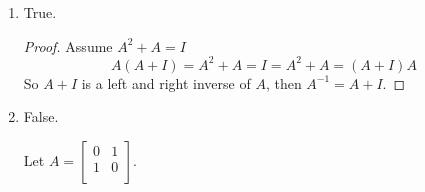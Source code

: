 \documentclass[12pt,letterpaper]{article}
\begin{document}
\begin{enumerate}
\begin{enumerate}
\begin{proof}
            So $L_2^{-1}L_1 = I$.

            Then,
            \begin{align*}
              L_2^{-1}L_1 &= I \\
              L_2\left(L_2^{-1}L_1\right) &= L_2I \\
              \left(L_2L_2^{-1}\right)L_1 &= L_2 \\
              IL_1 &= L_2 \\
              L_1 &= L_2
            \end{align*}

            And since $L_2^{-1}L_1 = I = U_2U_1^{-1}$, we have

            \begin{align*}
              I &= U_2U_1^{-1} \\
              IU_1 &= \left(U_2U_1^{-1}\right)U_1 \\
              U_1 &= U_2\left(U_1^{-1}U_1\right) \\
              U_1 &= U_2I \\
              U_1 &= U_2 \\
            \end{align*}

            So we have shown,

            if $A = L_1U_1 = L_2U_2$ with $L_1, L_2$ lower triangular and unit diagonal,
            $U_1, U_2$ upper triangular with nonzero diagonal,

            then $L_1 = L_2, U_1 = U_2$.
          \end{proof}
        \item
          True.

          \begin{proof}
            Assume $A^2 + A = I$
            \[
              A\left(A + I\right) = A^2 + A = I = A^2 + A = \left(A + I\right)A
            \]
            So $A + I$ is a left and right inverse of $A$,
            then $A^{-1} = A + I$.
          \end{proof}
        \item
          False.

          Let $A = \begin{bmatrix}0 & 1 \\ 1 & 0 \\\end{bmatrix}$.


\end{enumerate}
\end{enumerate}
\end{document}
